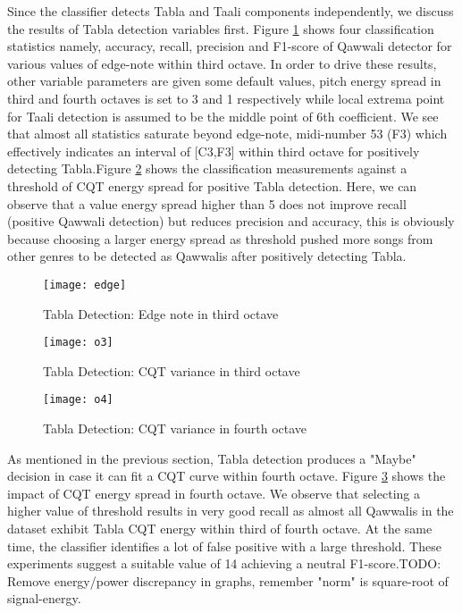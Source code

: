 \documentclass{article}
\begin{document}
Since the classifier detects Tabla and Taali components independently, we discuss the results of Tabla detection variables first. Figure \ref{fig:src_edge} shows four classification statistics namely, accuracy, recall, precision and F1-score of Qawwali detector for various values of edge-note within third octave. In order to drive these results, other variable parameters are given some default values, pitch energy spread in third and fourth octaves is set to 3 and 1 respectively while local extrema point for Taali detection is assumed to be the middle point of 6th coefficient.  
We see that almost all statistics saturate beyond edge-note, midi-number 53 (F3) which effectively indicates an interval of [C3,F3] within third octave for positively detecting Tabla.Figure \ref{fig:src_o3} shows the classification measurements against a threshold of CQT energy spread for positive Tabla detection. Here, we can observe that a value energy spread higher than 5 does not improve recall (positive Qawwali detection) but reduces precision and accuracy, this is obviously because choosing a larger energy spread as threshold pushed more songs from other genres to be detected as Qawwalis after positively detecting Tabla.
\begin{figure}[htbp]
  \centering
  \texttt{[image: edge]}
  \caption{Tabla Detection: Edge note in third octave}
\label{fig:src_edge}
\end{figure}
\begin{figure}[htbp]
  \centering
  \texttt{[image: o3]}
  \caption{Tabla Detection: CQT variance in third octave}
\label{fig:src_o3}
\end{figure}
\begin{figure}[htbp]
  \centering
  \texttt{[image: o4]}
  \caption{Tabla Detection: CQT variance in fourth octave}
\label{fig:src_o4}
\end{figure}
As mentioned in the previous section, Tabla detection produces a "Maybe" decision in case it can fit a CQT curve within fourth octave. Figure \ref{fig:src_o4} shows the impact of CQT energy spread in fourth octave. We observe that selecting a higher value of threshold results in very good recall as almost all Qawwalis in the dataset exhibit Tabla CQT energy within third of fourth octave. At the same time, the classifier identifies a lot of false positive with a large threshold. These experiments suggest a suitable value of 14 achieving a neutral F1-score.TODO: Remove energy/power discrepancy in graphs, remember "norm" is square-root of signal-energy.
\end{document}
